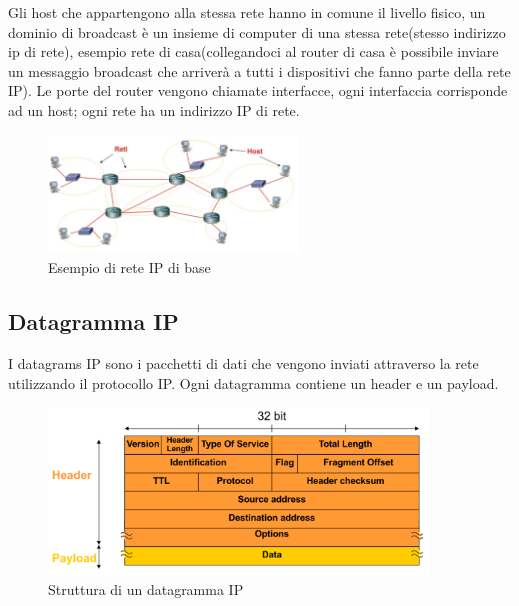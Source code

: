 Gli host che appartengono alla stessa rete hanno in comune il livello fisico,
un dominio di broadcast è un insieme di computer di una stessa rete(stesso indirizzo ip di rete), esempio rete di casa(collegandoci al router di casa è possibile inviare un messaggio broadcast che arriverà a tutti i dispositivi che fanno parte della rete IP).
Le porte del router vengono chiamate interfacce, ogni interfaccia corrisponde ad un host;
ogni rete ha un indirizzo IP di rete.

\begin{figure}[h!]
    \centering
    \includegraphics[width=0.59\textwidth]{images/reteipbase.png}
    \caption{Esempio di rete IP di base}
    \label{fig:reteipbase}
\end{figure}
\subsection{Datagramma IP}
I datagrams IP sono i pacchetti di dati che vengono inviati attraverso la rete utilizzando il protocollo IP. Ogni datagramma contiene un header e un payload. 
\begin{figure}[h!]
    \centering
    \includegraphics[width=0.9\textwidth]{images/datagrammaIP.png}
    \caption{Struttura di un datagramma IP}
    \label{fig:datagrammaIP}
\end{figure}

